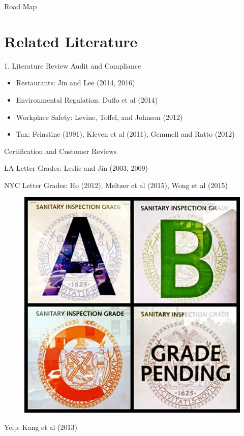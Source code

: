 \documentclass{beamer}
\begin{document}
\begin{frame}{Road Map}
\tableofcontents
\end{frame}

\section{Related Literature}
\begin{frame}{1. Literature Review}
Audit and Compliance
\begin{itemize}
\item Restaurants: Jin and Lee (2014, 2016)
\item Environmental Regulation: Duflo et al (2014) 
\item Workplace Safety: Levine, Toffel, and Johnson (2012)
\item Tax: Feinstine (1991), Kleven et al (2011), Gemmell and Ratto (2012)
\end{itemize}
Certification and Customer Reviews
\begin{itemize}
\item LA Letter Grades: Leslie and Jin (2003, 2009) 
\begin{minipage}{0.7\linewidth}
\item NYC Letter Grades: Ho (2012), Meltzer et al (2015), Wong et al (2015)
\end{minipage}
\begin{minipage}{0.25\linewidth}
\begin{figure}
\includegraphics[scale = 0.1]{grades.jpg}
\end{figure}
\end{minipage}
\item Yelp: Kang et al (2013) 
\end{itemize}
\end{frame}
\end{document}
